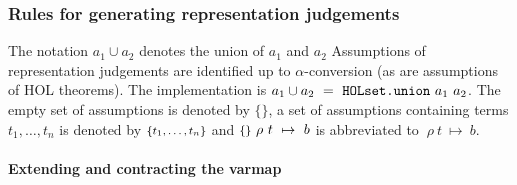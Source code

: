 \documentclass[12pt]{book}
\renewcommand{\t}[1]{\mbox{\tt #1}}
\newcommand{\termbdd}[4]{\mbox{$#1~#2~#3~\mapsto~#4$}}
\newcommand{\emptyass}{\mbox{\footnotesize$\{{}\}$}{}}
\newcommand{\setass}[1]{\mbox{\footnotesize$\{#1\}$}{}}
\begin{document}
\subsubsection{Rules for generating representation judgements}\label{term-bdd-rules}

The notation $a_1 \cup a_2$ denotes the union of $a_1$ and $a_2$ 
Assumptions of
representation judgements are identified up to $\alpha$-conversion (as
are assumptions of HOL theorems).
The implementation is $a_1 \cup a_2~=~\t{HOLset.union}~a_1~a_2$. 
The empty set of assumptions is denoted by \emptyass, a set of
assumptions containing terms $t_1, \ldots ,t_n$ is denoted by
$\setass{t_1, \ldots ,t_n}$  and 
$\termbdd{\emptyass}{\rho}{t}{b}$ is abbreviated to
$\termbdd{}{\rho}{t}{b}$.


\paragraph{Extending and contracting the varmap} {\(\)}\\  

\newsavebox\BddExtendVarmap
{}
\fbox{\usebox{\BddExtendVarmap}}
\end{document}
